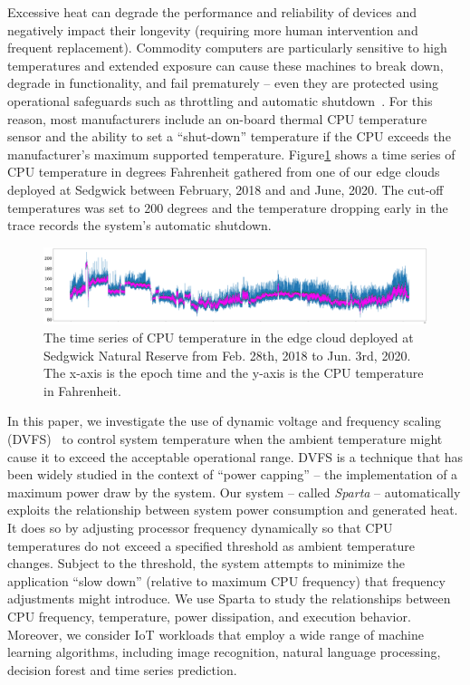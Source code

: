 Excessive heat can degrade the performance and reliability of devices and negatively impact their longevity (requiring more human intervention and frequent replacement). Commodity computers are particularly sensitive to high temperatures and extended exposure can cause these machines to break down, degrade in functionality, and fail prematurely -- even they are protected using operational safeguards such as throttling and automatic shutdown~\cite{ref:overheating}. For this reason, most manufacturers include an on-board thermal CPU temperature sensor and the ability to set a ``shut-down'' temperature if the CPU exceeds the manufacturer's maximum supported temperature. Figure\ref{fig:time_series} shows a time series of CPU temperature in degrees Fahrenheit gathered from one of our edge clouds deployed at Sedgwick between February, 2018 and and June, 2020. The cut-off temperatures was set to 200 degrees and the temperature dropping early in the trace records the system's automatic shutdown.

\begin{figure}
\includegraphics[width=\textwidth]{figures/time_series.png}
\caption{The time series of CPU temperature in the edge cloud deployed at Sedgwick Natural Reserve from Feb. 28th, 2018 to Jun. 3rd, 2020. The x-axis is the epoch time and the y-axis is the CPU temperature in Fahrenheit. } \label{fig:time_series}
\end{figure}

In this paper, we investigate the use of dynamic voltage and frequency scaling (DVFS)~\cite{ref:Liu2007dvfs,ref:Wang2010dvfs,ref:Deng2012dvfs,ref:Wu2013dvfs} to control system temperature when the ambient temperature might cause it to exceed the acceptable operational range. DVFS is a technique that has been widely studied in the context of ``power capping'' -- the implementation of a maximum power draw by the system.  Our system -- called \textit{Sparta} --  automatically exploits the relationship between system power consumption and generated heat.  It does so by adjusting processor frequency dynamically so that CPU temperatures do not exceed a specified threshold as ambient temperature changes.  Subject to the threshold, the system attempts to minimize the application ``slow down'' (relative to maximum CPU frequency) that frequency adjustments might introduce.  
We use Sparta to study the relationships between CPU frequency, temperature, power dissipation, and execution behavior. Moreover, we consider IoT workloads that employ a wide range of machine learning algorithms, including image recognition, natural language processing, decision forest and time series prediction. 

